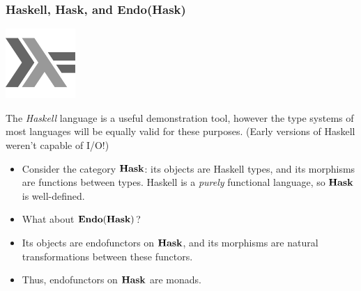 \documentclass{beamer}
\numberwithin{figure}{section}
\begin{document}
\begin{frame}
        \frametitle{Haskell, \textbf{Hask}, and \textbf{Endo}(\textbf{Hask})}
        \begin{center}
                \begin{minipage}{.2\textwidth}
                        \includegraphics{hasklogo.pdf}
                \end{minipage}
                \begin{minipage}{.7\textwidth}
                        The \textit{Haskell} language is a useful demonstration
                        tool, however the type systems of most languages will be
                        equally valid for these purposes. (Early versions of
                        Haskell weren't capable of I/O!)
                \end{minipage}
        \end{center}
        \pause
        \begin{itemize}
                \item Consider the category $\operatorname{\mathbf{Hask}}$: its objects are Haskell
                        types, and its morphisms are functions between types.
                        Haskell is a \textit{purely} functional language, so
                        $\operatorname{\mathbf{Hask}}$ is well-defined.
                \item What about $\operatorname{\mathbf{Endo}}(\operatorname{\mathbf{Hask}})$?
                \item Its objects are endofunctors on $\operatorname{\mathbf{Hask}}$, and its
                        morphisms are natural transformations between these
                        functors.
                \item Thus, endofunctors on $\operatorname{\mathbf{Hask}}$ are monads.
        \end{itemize}
\end{frame}
\end{document}
